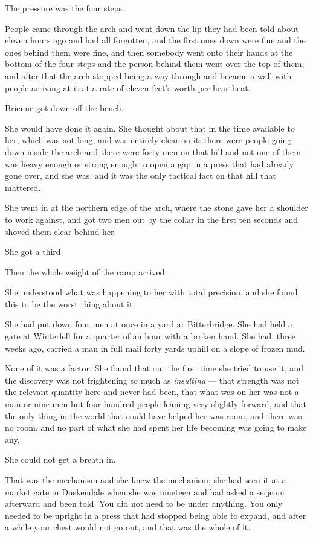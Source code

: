The pressure was the four steps.

People came through the arch and went down the lip they had been told about eleven hours ago and had all forgotten, and the first ones down were fine and the ones behind them were fine, and then somebody went onto their hands at the bottom of the four steps and the person behind them went over the top of them, and after that the arch stopped being a way through and became a wall with people arriving at it at a rate of eleven feet’s worth per heartbeat.

Brienne got down off the bench.

She would have done it again. She thought about that in the time available to her, which was not long, and was entirely clear on it: there were people going down inside the arch and there were forty men on that hill and not one of them was heavy enough or strong enough to open a gap in a press that had already gone over, and she was, and it was the only tactical fact on that hill that mattered.

She went in at the northern edge of the arch, where the stone gave her a shoulder to work against, and got two men out by the collar in the first ten seconds and shoved them clear behind her.

She got a third.

Then the whole weight of the ramp arrived.

\sceneBreak

She understood what was happening to her with total precision, and she found this to be the worst thing about it.

She had put down four men at once in a yard at Bitterbridge. She had held a gate at Winterfell for a quarter of an hour with a broken hand. She had, three weeks ago, carried a man in full mail forty yards uphill on a slope of frozen mud.

None of it was a factor. She found that out the first time she tried to use it, and the discovery was not frightening so much as \textit{insulting} — that strength was not the relevant quantity here and never had been, that what was on her was not a man or nine men but four hundred people leaning very slightly forward, and that the only thing in the world that could have helped her was room, and there was no room, and no part of what she had spent her life becoming was going to make any.

She could not get a breath in.

That was the mechanism and she knew the mechanism; she had seen it at a market gate in Duskendale when she was nineteen and had asked a serjeant afterward and been told. You did not need to be under anything. You only needed to be upright in a press that had stopped being able to expand, and after a while your chest would not go out, and that was the whole of it.

